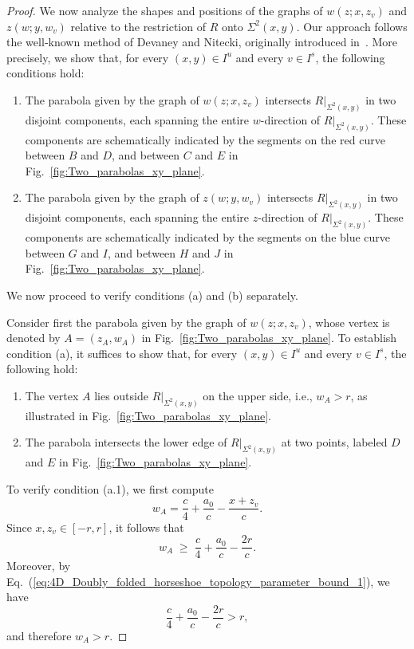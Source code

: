 \documentclass[12pt]{iopart}
\begin{document}
\begin{proof}
We now analyze the shapes and positions of the graphs of \( w(z;x,z_v) \) and \( z(w;y,w_v) \) relative to the restriction of \( R \) onto \( \Sigma^2(x,y) \). Our approach follows the well‑known method of Devaney and Nitecki, originally introduced in~\cite{Devaney79}. More precisely, we show that, for every \( (x,y)\in I^u \) and every \( v\in I^s \), the following conditions hold:
\begin{enumerate}
\item[(a)] The parabola given by the graph of \( w(z;x,z_v) \) intersects \( R|_{\Sigma^2(x,y)} \) in two disjoint components, each spanning the entire \( w \)-direction of \( R|_{\Sigma^2(x,y)} \). These components are schematically indicated by the segments on the red curve between \( B \) and \( D \), and between \( C \) and \( E \) in Fig.~\ref{fig:Two_parabolas_xy_plane}.
\item[(b)] The parabola given by the graph of \( z(w;y,w_v) \) intersects \( R|_{\Sigma^2(x,y)} \) in two disjoint components, each spanning the entire \( z \)-direction of \( R|_{\Sigma^2(x,y)} \). These components are schematically indicated by the segments on the blue curve between \( G \) and \( I \), and between \( H \) and \( J \) in Fig.~\ref{fig:Two_parabolas_xy_plane}.
\end{enumerate}

We now proceed to verify conditions (a) and (b) separately.

Consider first the parabola given by the graph of \( w(z;x,z_v) \), whose vertex is denoted by \( A = (z_A, w_A) \) in Fig.~\ref{fig:Two_parabolas_xy_plane}.  
To establish condition (a), it suffices to show that, for every \( (x,y)\in I^u \) and every \( v\in I^s \), the following hold:
\begin{enumerate}
\item[(a.1)] The vertex \( A \) lies outside \( R|_{\Sigma^2(x,y)} \) on the upper side, i.e., \( w_A > r \), as illustrated in Fig.~\ref{fig:Two_parabolas_xy_plane}.
\item[(a.2)] The parabola intersects the lower edge of \( R|_{\Sigma^2(x,y)} \) at two points, labeled \( D \) and \( E \) in Fig.~\ref{fig:Two_parabolas_xy_plane}.
\end{enumerate}

To verify condition (a.1), we first compute  
\begin{equation}
w_A = \frac{c}{4} + \frac{a_0}{c} - \frac{x+z_v}{c}.
\end{equation}
Since \( x, z_v \in [-r,r] \), it follows that  
\begin{equation}
w_A \;\geq\; \frac{c}{4} + \frac{a_0}{c} - \frac{2r}{c}.
\end{equation}
Moreover, by Eq.~(\ref{eq:4D_Doubly_folded_horseshoe_topology_parameter_bound_1}), we have  
\begin{equation}
\frac{c}{4} + \frac{a_0}{c} - \frac{2r}{c} > r,
\end{equation}
and therefore \( w_A > r \).


\end{proof}
\end{document}
